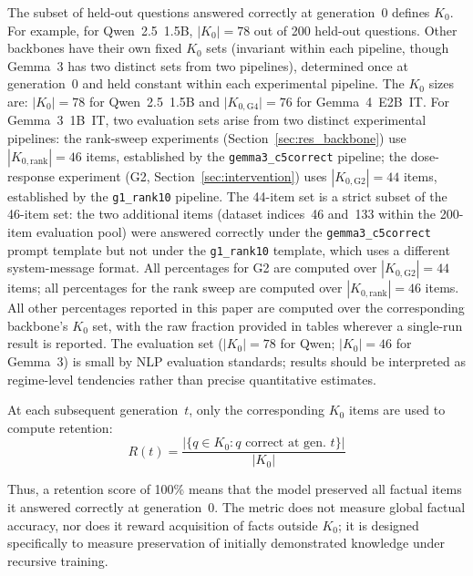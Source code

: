 \documentclass[a4paper,fleqn]{cas-dc}
\newif\ifshowchanges
\newcommand{\rev}[1]{\ifshowchanges{\color{blue}#1}\else{#1}\fi}
\newcommand{\KcardG}[1]{\lvert K_{0,\mathrm{#1}}\rvert}
\begin{document}
The subset of held-out questions answered correctly at generation~0 defines
$K_0$. For example, for Qwen~2.5~1.5B, $\lvert K_0\rvert=78$ out of 200 held-out
questions. Other backbones have their own fixed $K_0$ sets (invariant within each pipeline, though Gemma~3 has two distinct sets from two pipelines), determined once at
generation~0 and \rev{held constant within each experimental pipeline}.
\rev{The $K_0$ sizes are: $\lvert K_0\rvert=78$ for Qwen~2.5~1.5B and $\KcardG{G4}=76$ for
Gemma~4~E2B~IT. For Gemma~3~1B~IT, two evaluation sets arise from two distinct
experimental pipelines: the \rev{rank-sweep experiments}
(Section~\ref{sec:res_backbone}) use $|K_{0,\mathrm{rank}}|=46$ items, established
by the \texttt{gemma3\_c5correct} pipeline; the dose-response experiment (G2,
Section~\ref{sec:intervention}) uses $|K_{0,\mathrm{G2}}|=44$ items, established
by the \texttt{g1\_rank10} pipeline. The 44-item set is a strict subset of the
46-item set: the two additional items (dataset indices~46 and~133 within the
200-item evaluation pool) were answered correctly under the
\texttt{gemma3\_c5correct} prompt template but not under the \texttt{g1\_rank10}
template, which uses a different system-message format. All percentages for G2 are
computed over $|K_{0,\mathrm{G2}}|=44$ items; all percentages for the rank sweep
are computed over $|K_{0,\mathrm{rank}}|=46$ items. All other percentages reported
in this paper are computed over the corresponding backbone's $K_0$ set, with
the raw fraction provided in tables wherever a single-run result is reported.
\rev{The evaluation set ($|K_0|=78$ for Qwen; $|K_0|=46$ for Gemma~3) is small by
NLP evaluation standards; results should be interpreted as regime-level tendencies
rather than precise quantitative estimates.}}

At each subsequent generation~$t$, only the corresponding $K_0$ items are used
to compute retention:
\begin{equation}\label{eq:k0}
  \rev{R(t)} =
  \frac{|\{q \in K_0 : q \text{ correct at gen.\ } t\}|}{|K_0|}
\end{equation}

Thus, a retention score of 100\% means that the model preserved all factual
items it answered correctly at generation~0. The metric does not measure global
factual accuracy, nor does it reward acquisition of facts outside $K_0$; it is
designed specifically to measure preservation of initially demonstrated
knowledge under recursive training.
\end{document}
